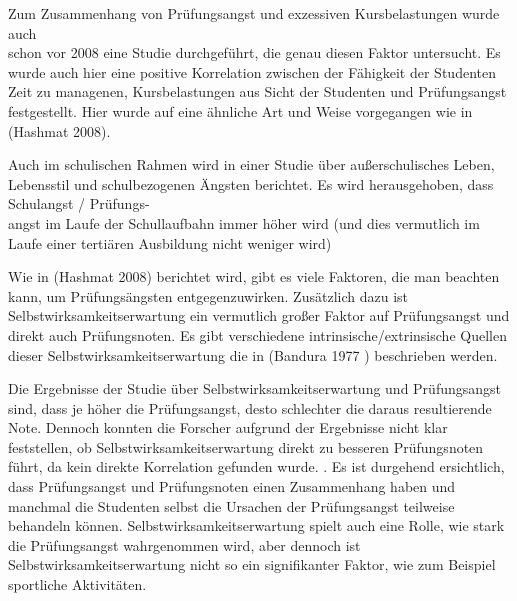 \documentclass[11pt, a4paper]{article}
\begin{document}
	Zum Zusammenhang von Prüfungsangst und exzessiven Kursbelastungen wurde auch \\schon vor 2008 eine Studie durchgeführt, die genau diesen Faktor untersucht. Es wurde auch hier eine positive Korrelation zwischen der Fähigkeit der Studenten Zeit zu managenen, Kursbelastungen aus Sicht der Studenten und Prüfungsangst festgestellt. Hier wurde auf eine ähnliche Art und Weise vorgegangen wie in (Hashmat 2008). \cite{sansgiry2006effect}

	Auch im schulischen Rahmen wird in einer Studie über außerschulisches Leben, Lebensstil und schulbezogenen Ängsten berichtet. Es wird herausgehoben, dass Schulangst / Prüfungs-\\angst im Laufe der Schullaufbahn immer höher wird (und dies vermutlich im Laufe einer tertiären Ausbildung nicht weniger wird) \cite{pixner2013prufungsangst}

	Wie in (Hashmat 2008) berichtet wird, gibt es viele Faktoren, die man beachten kann, um Prüfungsängsten entgegenzuwirken. Zusätzlich dazu ist Selbstwirksamkeitserwartung ein vermutlich großer Faktor auf Prüfungsangst und direkt auch Prüfungsnoten. Es gibt verschiedene intrinsische/extrinsische Quellen dieser Selbstwirksamkeitserwartung die in (Bandura 1977 \cite{bandura1977self}) beschrieben werden.

	Die Ergebnisse der Studie über Selbstwirksamkeitserwartung und Prüfungsangst sind, dass je höher die Prüfungsangst, desto schlechter die daraus resultierende Note. Dennoch konnten die Forscher aufgrund der Ergebnisse nicht klar feststellen, ob Selbstwirksamkeitserwartung direkt zu besseren Prüfungsnoten führt, da kein direkte Korrelation gefunden wurde. \cite{barrows2013anxiety}. Es ist durgehend ersichtlich, dass Prüfungsangst und Prüfungsnoten einen Zusammenhang haben und manchmal die Studenten selbst die Ursachen der Prüfungsangst teilweise behandeln können. Selbstwirksamkeitserwartung spielt auch eine Rolle, wie stark die Prüfungsangst wahrgenommen wird, aber dennoch ist Selbstwirksamkeitserwartung nicht so ein signifikanter Faktor, wie zum Beispiel sportliche Aktivitäten. \cite{barrows2013anxiety} \cite{hashmat2008factors}
\newpage

{}

\end{document}
